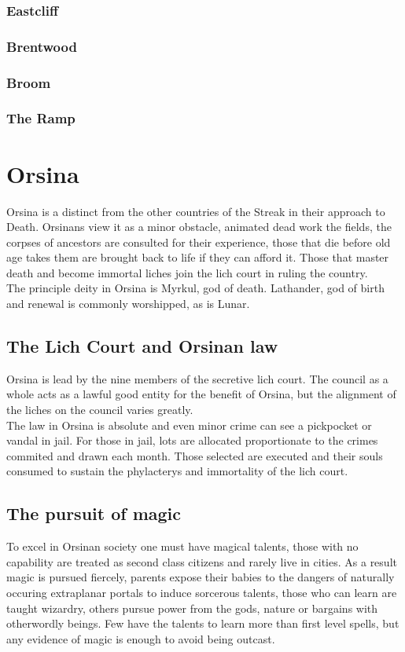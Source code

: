 \documentclass[10pt,twoside,twocolumn,openany,justified,bg=full,nomultitoc]{dndbook}
\begin{document}
\subsection{Eastcliff}
\label{sec-2-3-3}
\subsection{Brentwood}
\label{sec-2-3-4}
\subsection{Broom}
\label{sec-2-3-5}
\subsection{The Ramp}
\label{sec-2-3-6}
\chapter{Orsina}
\label{sec-3}
Orsina is a distinct from the other countries of the Streak in their approach to Death. Orsinans view it as a minor obstacle, animated dead work the fields, the corpses of ancestors are consulted for their experience, those that die before old age takes them are brought back to life if they can afford it. Those that master death and become immortal liches join the lich court in ruling the country.\\


The principle deity in Orsina is Myrkul, god of death. Lathander, god of birth and renewal is commonly worshipped, as is Lunar.

\section{The Lich Court and Orsinan law}
\label{sec-3-1}
Orsina is lead by the nine members of the secretive lich court. The council as a whole acts as a lawful good entity for the benefit of Orsina, but the alignment of the liches on the council varies greatly.\\

The law in Orsina is absolute and even minor crime can see a pickpocket or vandal in jail. For those in jail, lots are allocated proportionate to the crimes commited and drawn each month. Those selected are executed and their souls consumed to sustain the phylacterys and immortality of the lich court. 

\section{The pursuit of magic}
\label{sec-3-2}
To excel in Orsinan society one must have magical talents, those with no capability are treated as second class citizens and rarely live in cities. As a result magic is pursued fiercely, parents expose their babies to the dangers of naturally occuring extraplanar portals to induce sorcerous talents, those who can learn are taught wizardry, others pursue power from the gods, nature or bargains with otherwordly beings. Few have the talents to learn more than first level spells, but any evidence of magic is enough to avoid being outcast.
\end{document}
